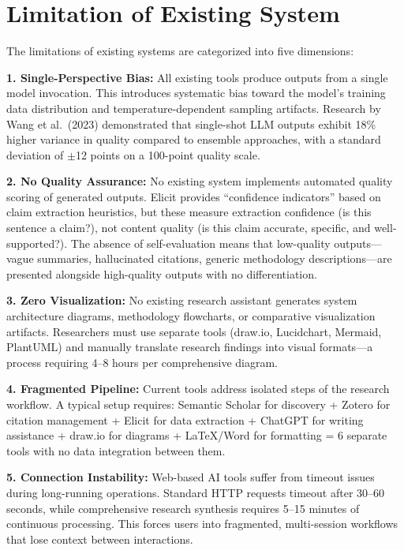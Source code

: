 \section{Limitation of Existing System}

The limitations of existing systems are categorized into five dimensions:

\textbf{1. Single-Perspective Bias:} All existing tools produce outputs from a single model invocation. This introduces systematic bias toward the model's training data distribution and temperature-dependent sampling artifacts. Research by Wang et al.\ (2023) demonstrated that single-shot LLM outputs exhibit 18\% higher variance in quality compared to ensemble approaches, with a standard deviation of $\pm$12 points on a 100-point quality scale.

\textbf{2. No Quality Assurance:} No existing system implements automated quality scoring of generated outputs. Elicit provides ``confidence indicators'' based on claim extraction heuristics, but these measure extraction confidence (is this sentence a claim?), not content quality (is this claim accurate, specific, and well-supported?). The absence of self-evaluation means that low-quality outputs---vague summaries, hallucinated citations, generic methodology descriptions---are presented alongside high-quality outputs with no differentiation.

\textbf{3. Zero Visualization:} No existing research assistant generates system architecture diagrams, methodology flowcharts, or comparative visualization artifacts. Researchers must use separate tools (draw.io, Lucidchart, Mermaid, PlantUML) and manually translate research findings into visual formats---a process requiring 4--8 hours per comprehensive diagram.

\textbf{4. Fragmented Pipeline:} Current tools address isolated steps of the research workflow. A typical setup requires: Semantic Scholar for discovery + Zotero for citation management + Elicit for data extraction + ChatGPT for writing assistance + draw.io for diagrams + LaTeX/Word for formatting = 6 separate tools with no data integration between them.

\textbf{5. Connection Instability:} Web-based AI tools suffer from timeout issues during long-running operations. Standard HTTP requests timeout after 30--60 seconds, while comprehensive research synthesis requires 5--15 minutes of continuous processing. This forces users into fragmented, multi-session workflows that lose context between interactions.

